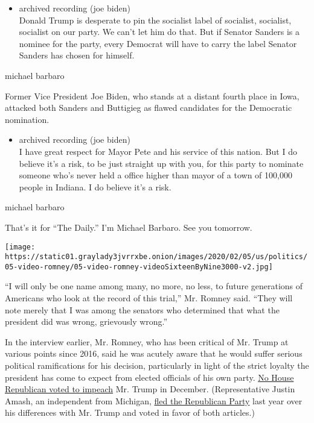 \begin{itemize}
\tightlist
\item
  archived recording (joe biden)\\
  Donald Trump is desperate to pin the socialist label of socialist,
  socialist, socialist on our party. We can't let him do that. But if
  Senator Sanders is a nominee for the party, every Democrat will have
  to carry the label Senator Sanders has chosen for himself.
\end{itemize}

michael barbaro

Former Vice President Joe Biden, who stands at a distant fourth place in
Iowa, attacked both Sanders and Buttigieg as flawed candidates for the
Democratic nomination.

\begin{itemize}
\tightlist
\item
  archived recording (joe biden)\\
  I have great respect for Mayor Pete and his service of this nation.
  But I do believe it's a risk, to be just straight up with you, for
  this party to nominate someone who's never held a office higher than
  mayor of a town of 100,000 people in Indiana. I do believe it's a
  risk.
\end{itemize}

michael barbaro

That's it for ``The Daily.'' I'm Michael Barbaro. See you tomorrow.

\texttt{[image: https://static01.graylady3jvrrxbe.onion/images/2020/02/05/us/politics/05-video-romney/05-video-romney-videoSixteenByNine3000-v2.jpg]}

``I will only be one name among many, no more, no less, to future
generations of Americans who look at the record of this trial,'' Mr.
Romney said. ``They will note merely that I was among the senators who
determined that what the president did was wrong, grievously wrong.''

In the interview earlier, Mr. Romney, who has been critical of Mr. Trump
at various points since 2016, said he was acutely aware that he would
suffer serious political ramifications for his decision, particularly in
light of the strict loyalty the president has come to expect from
elected officials of his own party.
\href{https://www.nytimes3xbfgragh.onion/interactive/2019/12/18/us/politics/trump-impeachment-vote.html}{No
House Republican voted to impeach} Mr. Trump in December.
(Representative Justin Amash, an independent from Michigan,
\href{https://www.nytimes3xbfgragh.onion/2019/07/04/us/politics/justin-amash-trump.html}{fled
the Republican Party} last year over his differences with Mr. Trump and
voted in favor of both articles.)

